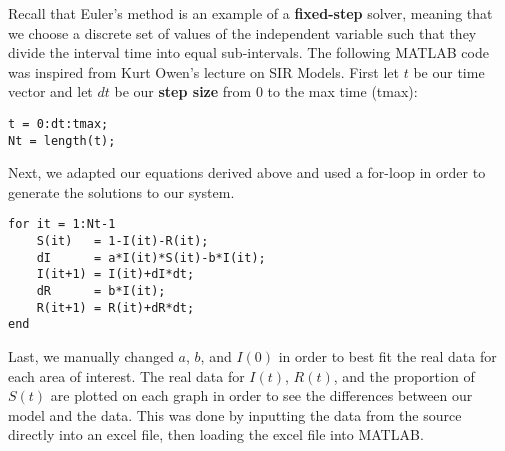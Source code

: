 \documentclass[a4paper,10pt]{article}
\begin{document}







Recall that Euler's method is an example of a \textbf{fixed-step} solver, meaning that we choose a discrete set of values of the independent variable such that they divide the interval time into equal sub-intervals. The following MATLAB\textsuperscript{\textregistered} code was inspired from Kurt Owen's lecture on SIR Models\textsuperscript{\cite{CalDisc1}}. First let $t$ be our time vector and let $dt$ be our \textbf{step size} from $0$ to the max time (tmax):

\begin{verbatim}
t = 0:dt:tmax;
Nt = length(t);
\end{verbatim}

\noindent Next, we adapted our equations derived above and used a for-loop in order to generate the solutions to our system. 

\begin{verbatim}
for it = 1:Nt-1
    S(it)   = 1-I(it)-R(it); 
    dI      = a*I(it)*S(it)-b*I(it); 
    I(it+1) = I(it)+dI*dt; 
    dR      = b*I(it); 
    R(it+1) = R(it)+dR*dt;
end
\end{verbatim}

\noindent Last, we manually changed $a$, $b$, and $I(0)$ in order to best fit the real data\textsuperscript{\cite{WorldMeter}} for each area of interest. The real data for $I(t)$, $R(t)$, and the proportion of $S(t)$ are plotted on each graph in order to see the differences between our model and the data. This was done by inputting the data from the source directly into an excel file, then loading the excel file into MATLAB\textsuperscript{\textregistered}.
\end{document}
